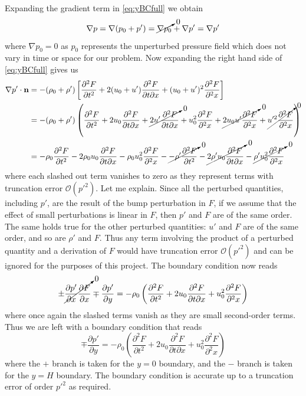 \documentclass[11pt]{article}
\begin{document}
Expanding the gradient term in \eqref{eq:yBCfull} we obtain 
\begin{equation*}
  \nabla p = \nabla(p_0 + p') = \cancelto{0}{\nabla p_0} + \nabla p' = \nabla p'
\end{equation*}
where $\nabla p_0 = 0$ as $p_0$ represents the unperturbed pressure field which does not vary in time or space for our problem. Now expanding the right hand side of \eqref{eq:yBCfull} gives us
\begin{align*}
  \nabla p' \cdot \mathbf{n}
  &= -(\rho_0 + \rho') \left[ \frac{\partial^2 F}{\partial t^2} + 2(u_0 + u')\frac{\partial^2 F}{\partial t \partial x} + (u_0 + u')^2 \frac{\partial^2 F}{\partial^2 x} \right] \\
  &= -(\rho_0 + \rho') \left( \frac{\partial^2 F}{\partial t^2} + 2u_0 \frac{\partial^2 F}{\partial t \partial x} + \cancelto{0}{2u'\frac{\partial^2 F}{\partial t \partial x}} + u_0^2\frac{\partial^2 F}{\partial^2 x} + \cancelto{0}{2u_0u' \frac{\partial^2 F}{\partial^2 x}} + \cancelto{0}{u'^2 \frac{\partial^2 F}{\partial^2 x}} \right) \\
  &= -\rho_0 \frac{\partial^2 F}{\partial t^2} - 2\rho_0 u_0 \frac{\partial^2 F}{\partial t \partial x} - \rho_0 u_0^2\frac{\partial^2 F}{\partial^2 x} - \cancelto{0}{-\rho' \frac{\partial^2 F}{\partial t^2}} - \cancelto{0}{2\rho' u_0 \frac{\partial^2 F}{\partial t \partial x}} - \cancelto{0}{\rho' u_0^2\frac{\partial^2 F}{\partial^2 x}}
\end{align*}
where each slashed out term vanishes to zero as they represent terms with truncation error $\mathcal{O}(p'^2)$. Let me explain. Since all the perturbed quantities, including $p'$, are the result of the bump perturbation in $F$, if we assume that the effect of small perturbations is linear in $F$, then $p'$ and $F$ are of the same order. The same holds true for the other perturbed quantities: $u'$ and $F$ are of the same order, and so are $\rho'$ and $F$. Thus any term involving the product of a perturbed quantity and a derivation of $F$ would have truncation error $\mathcal{O}(p'^2)$ and can be ignored for the purposes of this project. The boundary condition now reads
\begin{equation*}
    \pm \cancelto{0}{\frac{\partial p'}{\partial x}\frac{\partial F}{\partial x}} \mp \frac{\partial p'}{\partial y} = -\rho_0 \left( \frac{\partial^2 F}{\partial t^2} + 2u_0 \frac{\partial^2 F}{\partial t \partial x} + u_0^2\frac{\partial^2 F}{\partial^2 x} \right)
\end{equation*}
where once again the slashed terms vanish as they are small second-order terms. Thus we are left with a boundary condition that reads 
\begin{equation} \label{eq:yBCwitht}
 \mp \frac{\partial p'}{\partial y} = -\rho_0 \left( \frac{\partial^2 F}{\partial t^2} + 2u_0 \frac{\partial^2 F}{\partial t \partial x} + u_0^2\frac{\partial^2 F}{\partial^2 x} \right)
\end{equation}
where the $+$ branch is taken for the $y=0$ boundary, and the $-$ branch is taken for the $y=H$ boundary. The boundary condition is accurate up to a truncation error of order $p'^2$ as required. \\
\end{document}
